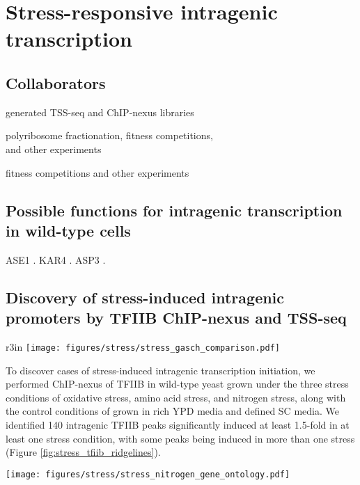 \chapter{Stress-responsive intragenic transcription}
\label{chapter:stress}

\section{Collaborators}

\begin{description}[align=right, labelwidth=5cm, noitemsep, leftmargin=!]
    \item [Steve Doris] generated TSS-seq and ChIP-nexus libraries
    \item [Dan Spatt] polyribosome fractionation, fitness competitions,\\and other experiments
    \item [James Warner] fitness competitions and other experiments
\end{description}

\section{Possible functions for intragenic transcription in wild-type cells}

ASE1 \citep{mcknight2014}.
KAR4 \citep{gammie1999}.
ASP3 \citep{huang2010}.

\section{Discovery of stress-induced intragenic promoters by TFIIB ChIP-nexus and TSS-seq}

\begin{wrapfigure}[10]{r}{3in}
    \centering
    \texttt{[image: figures/stress/stress\_gasch\_comparison.pdf]}
    \caption[]{}
    \label{fig:stress_gasch_comparison}
\end{wrapfigure}
To discover cases of stress-induced intragenic transcription initiation, we performed ChIP-nexus of TFIIB in wild-type yeast grown under the three stress conditions of oxidative stress, amino acid stress, and nitrogen stress, along with the control conditions of grown in rich YPD media and defined SC media.
We identified 140 intragenic TFIIB peaks significantly induced at least 1.5-fold in at least one stress condition, with some peaks being induced in more than one stress (Figure \ref{fig:stress_tfiib_ridgelines}).
\begin{SCfigure}[50][h]
    \centering
    \texttt{[image: figures/stress/stress\_nitrogen\_gene\_ontology.pdf]}
    \caption[]{}
    \label{fig:stress_nitrogen_gene_ontology}
\end{SCfigure}


